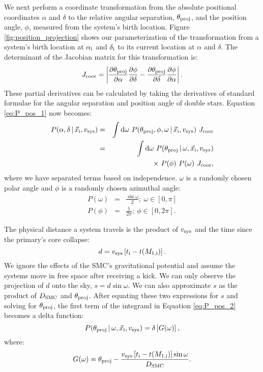 \documentclass[usenatbib]{mnras}
\newcommand{\given}{\,|\,}
\newcommand{\dd}{\mathrm{d}}
\begin{document}
We next perform a coordinate transformation from the absolute positional coordinates $\alpha$ and $\delta$ to the relative angular separation, $\theta_{\rm proj}$, and the position angle, $\phi$, measured from the system's birth location. Figure \ref{fig:position_projection} shows our parameterization of the transformation from a system's birth location at $\alpha_{\rm i}$ and $\delta_{\rm i}$ to its current location at $\alpha$ and $\delta$. The determinant of the Jacobian matrix for this transformation is:
\begin{equation}
J_{\rm coor} = \left| \frac{\partial \theta_{\rm proj}}{\partial \alpha} \frac{\partial \phi}{\partial \delta} - \frac{\partial \theta_{\rm proj}}{\partial \delta}\frac{\partial \phi}{\partial \alpha}  \right|.
\end{equation}
These partial derivatives can be calculated by taking the derivatives of standard formulae for the angular separation and position angle of double stars. Equation \ref{eq:P_pos_1} now becomes:
\begin{eqnarray}
P(\alpha, \delta \given \vec{x}_{\rm i}, v_{\rm sys} ) &=& \int \dd \omega\ P(\theta_{\rm proj}, \phi, \omega \given \vec{x}_{\rm i}, v_{\rm sys} )\ J_{\rm coor} \nonumber \\
&=& \int \dd \omega\ P(\theta_{\rm proj} \given \omega,  \vec{x}_{\rm i}, v_{\rm sys} ) \nonumber \\
& & \qquad \times\ P(\phi)\ P(\omega)\ J_{\rm coor}, \label{eq:P_pos_2}
\end{eqnarray}
where we have separated terms based on independence. $\omega$ is a randomly chosen polar angle and $\phi$ is a randomly chosen azimuthal angle: 
\begin{eqnarray}
P(\omega) &=& \frac{\sin \omega} {2};\ \omega \in [0,\pi] \\
P(\phi) &=& \frac{1}{2 \pi};\ \phi \in [0, 2\pi].
\end{eqnarray}


The physical distance a system travels is the product of $v_{\rm sys}$ and the time since the primary's core collapse:
\begin{equation}
d = v_{\rm sys} \left[t_{\rm i} - t(M_{\rm 1,i}) \right].
\end{equation}
We ignore the effects of the SMC's gravitational potential and assume the systems move in free space after receiving a kick. We can only observe the projection of $d$ onto the sky, $s = d \sin \omega$. We can also approximate $s$ as the product of $D_{\rm SMC}$ and $\theta_{\rm proj}$. After equating these two expressions for $s$ and solving for $\theta_{\rm proj}$, the first term of the integrand in Equation \ref{eq:P_pos_2} becomes a delta function:
\begin{equation}
P(\theta_{\rm proj} \given \omega, \vec{x}_{\rm i}, v_{\rm sys}) = \delta \left[G(\omega)\right], \label{eq:P_theta_proj}
\end{equation}
where:
\begin{equation}
G(\omega) = \theta_{\rm proj} - \frac{v_{\rm sys} \left[t_{\rm i} - t(M_{\rm 1,i}) \right] \sin \omega}{D_{\rm SMC}}.\end{equation}
\end{document}
